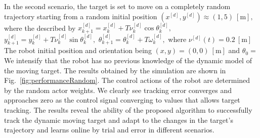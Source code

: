 \documentclass[conference]{IEEEtran}
\begin{document}
In the second scenario, the target is set to move on a completely random trajectory starting from a random initial position $(x^{[d]},y^{[d]})\approx (1,5)~[\si{\meter}],$ where the  described by %
%
 $x_{k+1}^{[d]} = x_k^{[d]} + T\nu_k^{[d]}\cos\theta_k^{[d]},$ %
 $y_{k+1}^{[d]} = y_k^{[d]} + T\nu_k^{[d]}\sin\theta_k^{[d]},$ %
 $\theta_{k+1}^{[d]} = \theta_k^{[d]} +T\omega_k^{[d]},$ %
 where $\nu^{[d]}(t)=0.2~[\si{\meter}]$ The robot initial position and orientation being $(x,y) = (0,0)~[\si{\meter}]$ and $\theta_0 = $ We intensify that the robot has no previous knowledge of the dynamic model of the moving target. The results obtained by the simulation are shown in Fig.~\ref{fig:performanceRandom}. The control actions of the robot are determined by the random actor weights. We clearly see tracking error converges and approaches zero as the control signal converging to values that allows target tracking. The results reveal the ability of the proposed algorithm to successfully track the dynamic moving target and adapt to the changes in the target's trajectory and learns online by trial and error in different scenarios. %
%    
\end{document}
